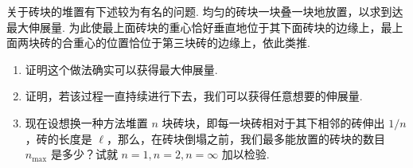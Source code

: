 \begin{exercise}\label{ex:6.10}
关于砖块的堆置有下述较为有名的问题. 均匀的砖块一块叠一块地放置，以求到达最大伸展量. 为此使最上面砖块的重心恰好垂直地位于其下面砖块的边缘上，最上面两块砖的合重心的位置恰位于第三块砖的边缘上，依此类推. 
\begin{enumerate}
  \item[(a)] 证明这个做法确实可以获得最大伸展量. 
  \item[(b)] 证明，若该过程一直持续进行下去，我们可以获得任意想要的伸展量. 
  \item[(c)] 现在设想换一种方法堆置 $n$ 块砖块，即每一块砖相对于其下相邻的砖伸出 $1/n$，砖的长度是 $\ell$，那么，在砖块倒塌之前，我们最多能放置的砖块的数目 $n_{\max}$ 是多少？试就 $n=1, n=2, n=\infty$ 加以检验.
\end{enumerate}
\end{exercise}
